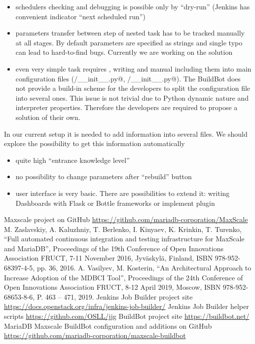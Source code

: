 \documentclass[10pt, a5paper]{article}
\begin{document}
\begin{itemize}
  \item schedulers checking and debugging is possible only by ``dry-run'' (Jenkins has convenient indicator ``next scheduled run'')
  \item parameters transfer between step of nested task has to be tracked manually at all stages. By default parameters are specified as strings and single typo can lead to hard-to-find bugs. Currently we are working on the solution
  \item even very simple task requires \verb@builder@, \verb@scheduler@ writing and manual including them into main configuration files \linebreak(\verb@builders/__init__.py@, \verb@schedulers/__init__.py@). The \linebreak BuildBot does not provide a build-in scheme for the developers to split the configuration file into several ones. This issue is not trivial due to Python dynamic nature and interpreter properties. Therefore the developers are required to propose a solution of their own.
\end{itemize}

In our current setup it is needed to add information into several files. We should explore the possibility to get this information automatically

\begin{itemize}
  \item quite high ``entrance knowledge level''
  \item no possibility to change parameters after ``rebuild'' button
  \item user interface is very basic. There are possibilities to extend it: writing Dashboards with Flask or Bottle frameworks or implement plugin
\end{itemize}

\begin{thebibliography}{9}

 Maxscale project on GitHub \url{https://github.com/mariadb-corporation/MaxScale}
  M. Zaslavskiy, A. Kaluzhniy, T. Berlenko, I. Kinyaev, K. Krinkin, T. Turenko, ``Full automated continuous integration and testing infrastructure for MaxScale and MariaDB'', Proceedings of the 19th Conference of Open Innovations Association FRUCT, 7-11 November 2016, Jyväskylä, Finland, ISBN 978-952-68397-4-5, pp. 36, 2016.
 A. Vasilyev, M. Kosterin, ``An Architectural Approach to Increase Adoption of the MDBCI Tool'', Proceedings of the 24th Conference of Open Innovations Association FRUCT, 8-12 April 2019, Moscow, ISBN 978-952-68653-8-6, P. 463 -- 471, 2019.
 Jenkins Job Builder project site \url{https://docs.openstack.org/infra/jenkins-job-builder/}
 Jenkins Job Builder helper scripts \url{https://github.com/OSLL/jjg}
 BuildBot project site \url{https://buildbot.net/}
 MariaDB Maxscale BuildBot configuration and additions on GitHub \url{https://github.com/mariadb-corporation/maxscale-buildbot}

\end{thebibliography}
\end{document}
